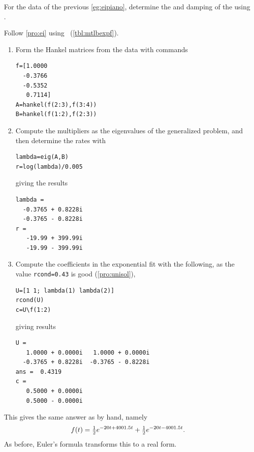 \begin{example} \label{eg:eipianu}
For the data of the previous \cref{eg:eipiano}, determine the  and damping of the  using \script.

\begin{solution} 
Follow \cref{pro:ei} using \script\ (\cref{tbl:mtlbexpf}). 
\begin{enumerate}
\item Form the Hankel matrices from the data with commands
\begin{verbatim}
f=[1.0000
  -0.3766
  -0.5352
   0.7114]
A=hankel(f(2:3),f(3:4))
B=hankel(f(1:2),f(2:3))
\end{verbatim}
\setbox\ajrqrbox\hbox{}%
\marginajrbox%

\item Compute the multipliers as the eigenvalues of the generalized problem, and then determine the rates with
\begin{verbatim}
lambda=eig(A,B)
r=log(lambda)/0.005
\end{verbatim}
giving the results
\begin{verbatim}
lambda =
  -0.3765 + 0.8228i
  -0.3765 - 0.8228i
r =
   -19.99 + 399.99i
   -19.99 - 399.99i
\end{verbatim}


\item Compute the coefficients in the exponential fit with the following, as the value \verb|rcond=0.43| is good (\cref{pro:unisol}),
\begin{verbatim}
U=[1 1; lambda(1) lambda(2)]
rcond(U)
c=U\f(1:2)
\end{verbatim}
giving results
\begin{verbatim}
U =
   1.0000 + 0.0000i   1.0000 + 0.0000i
  -0.3765 + 0.8228i  -0.3765 - 0.8228i
ans =  0.4319
c =
   0.5000 + 0.0000i
   0.5000 - 0.0000i
\end{verbatim}
\end{enumerate}
This gives the same answer as by hand, namely 
\begin{equation*}
f(t)=\tfrac12e^{-20t+4001.5 t}+\tfrac12e^{-20t-4001.5 t}.
\end{equation*}
As before, Euler's formula transforms this to a real form.
\end{solution}
\end{example}



